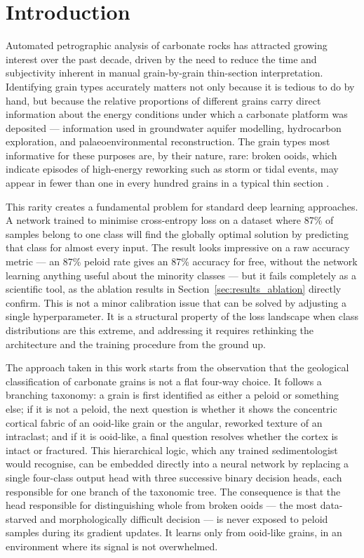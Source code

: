 \documentclass[a4paper,fleqn]{cas-dc}
\begin{document}
\section{Introduction}

Automated petrographic analysis of carbonate rocks has attracted growing interest over the past decade, driven by the need to reduce the time and subjectivity inherent in manual grain-by-grain thin-section interpretation. Identifying grain types accurately matters not only because it is tedious to do by hand, but because the relative proportions of different grains carry direct information about the energy conditions under which a carbonate platform was deposited --- information used in groundwater aquifer modelling, hydrocarbon exploration, and palaeoenvironmental reconstruction. The grain types most informative for these purposes are, by their nature, rare: broken ooids, which indicate episodes of high-energy reworking such as storm or tidal events, may appear in fewer than one in every hundred grains in a typical thin section \citep{flugel2010}.

This rarity creates a fundamental problem for standard deep learning approaches. A network trained to minimise cross-entropy loss on a dataset where 87\% of samples belong to one class will find the globally optimal solution by predicting that class for almost every input. The result looks impressive on a raw accuracy metric --- an 87\% peloid rate gives an 87\% accuracy for free, without the network learning anything useful about the minority classes --- but it fails completely as a scientific tool, as the ablation results in Section~\ref{sec:results_ablation} directly confirm. This is not a minor calibration issue that can be solved by adjusting a single hyperparameter. It is a structural property of the loss landscape when class distributions are this extreme, and addressing it requires rethinking the architecture and the training procedure from the ground up.

The approach taken in this work starts from the observation that the geological classification of carbonate grains is not a flat four-way choice. It follows a branching taxonomy: a grain is first identified as either a peloid or something else; if it is not a peloid, the next question is whether it shows the concentric cortical fabric of an ooid-like grain or the angular, reworked texture of an intraclast; and if it is ooid-like, a final question resolves whether the cortex is intact or fractured. This hierarchical logic, which any trained sedimentologist would recognise, can be embedded directly into a neural network by replacing a single four-class output head with three successive binary decision heads, each responsible for one branch of the taxonomic tree. The consequence is that the head responsible for distinguishing whole from broken ooids --- the most data-starved and morphologically difficult decision --- is never exposed to peloid samples during its gradient updates. It learns only from ooid-like grains, in an environment where its signal is not overwhelmed.
\end{document}
